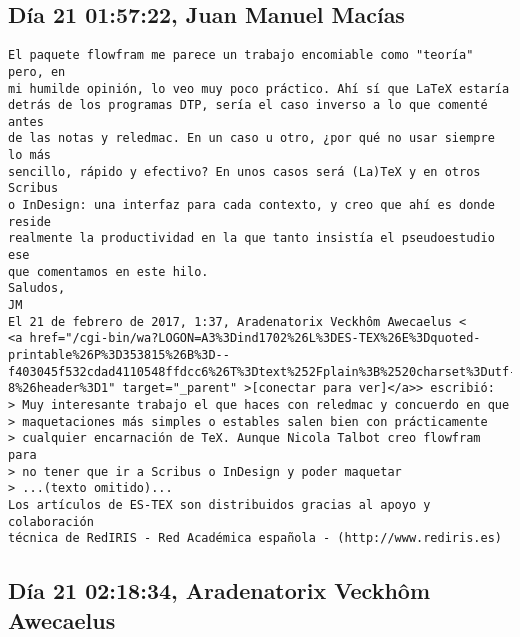 \documentclass[a4paper,10pt]{article}
\begin{document}
\subsection{Día 21 01:57:22, Juan Manuel Macías}

\begin{lstlisting}
El paquete flowfram me parece un trabajo encomiable como "teoría" pero, en
mi humilde opinión, lo veo muy poco práctico. Ahí sí que LaTeX estaría
detrás de los programas DTP, sería el caso inverso a lo que comenté antes
de las notas y reledmac. En un caso u otro, ¿por qué no usar siempre lo más
sencillo, rápido y efectivo? En unos casos será (La)TeX y en otros Scribus
o InDesign: una interfaz para cada contexto, y creo que ahí es donde reside
realmente la productividad en la que tanto insistía el pseudoestudio ese
que comentamos en este hilo.
Saludos,
JM
El 21 de febrero de 2017, 1:37, Aradenatorix Veckhôm Awecaelus <
<a href="/cgi-bin/wa?LOGON=A3%3Dind1702%26L%3DES-TEX%26E%3Dquoted-printable%26P%3D353815%26B%3D--f403045f532cdad4110548ffdcc6%26T%3Dtext%252Fplain%3B%2520charset%3Dutf-8%26header%3D1" target="_parent" >[conectar para ver]</a>> escribió:
> Muy interesante trabajo el que haces con reledmac y concuerdo en que
> maquetaciones más simples o estables salen bien con prácticamente
> cualquier encarnación de TeX. Aunque Nicola Talbot creo flowfram para
> no tener que ir a Scribus o InDesign y poder maquetar
> ...(texto omitido)...
Los artículos de ES-TEX son distribuidos gracias al apoyo y colaboración 
técnica de RedIRIS - Red Académica española - (http://www.rediris.es)

\end{lstlisting}

\subsection{Día 21 02:18:34, Aradenatorix Veckhôm Awecaelus}
\end{document}
